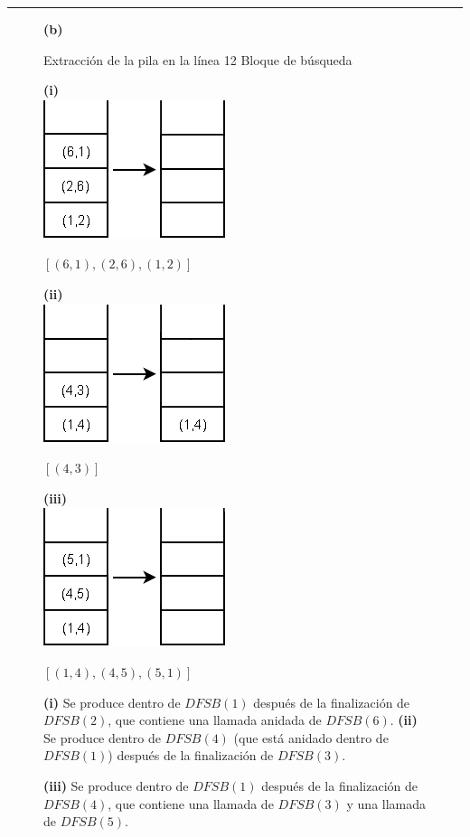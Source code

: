\documentclass[10pt,a5paper]{book}
\begin{document}
\hrule
\begin{figure}[H]
\begin{flushleft} \textbf{(b)} \end{flushleft}
\begin{center} Extracción de la pila en la línea 12 \hspace*{0.25in} Bloque de búsqueda\end{center}
\begin{center}
\parbox{3cm}
{
  \textbf{(i)}\\
    \includegraphics[scale=0.5]{Fig1_19_b1.png}
}
\hspace*{1in}
\parbox{2cm}
{
$ [(6,1),(2,6),(1,2)] $
}
\end{center}
\begin{center}
\parbox{3cm}
{
  \textbf{(ii)}\\
    \includegraphics[scale=0.5]{Fig1_19_b2.png}
}
\hspace*{1in}
\parbox{2cm}
{
$ [(4,3)] $
}
\end{center}
\begin{center}
\parbox{3cm}
{
  \textbf{(iii)}\\
    \includegraphics[scale=0.5]{Fig1_19_b3.png}
}
\hspace*{1in}
\parbox{2cm}
{
$ [(1,4),(4,5),(5,1)] $
}
\end{center}

\textbf{(i)} Se produce dentro de $DFSB(1)$ después de la finalización de $DFSB(2)$, que contiene una llamada anidada de $DFSB(6)$.
\textbf{(ii)} Se produce dentro de $DFSB(4)$ (que está anidado dentro de $DFSB(1)$) después de la finalización de $DFSB(3)$.

\textbf{(iii)} Se produce dentro de $DFSB(1)$ después de la finalización de $DFSB(4)$, que contiene una llamada de $DFSB(3)$ y una llamada de $DFSB(5)$.

\hrulefill{}\\
\end{figure}
\end{document}
